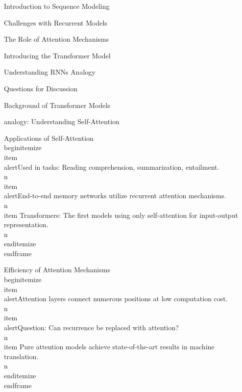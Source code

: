 \documentclass{beamer}
\begin{document}
\begin{frame}[]{Introduction to Sequence Modeling}
\begin{frame}[]{Challenges with Recurrent Models}
\begin{frame}[]{The Role of Attention Mechanisms}
\begin{frame}[]{Introducing the Transformer Model}
\begin{frame}[plain]{Understanding RNNs Analogy}
\begin{frame}[]{Questions for Discussion}
\begin{frame}[]{Background of Transformer Models}
\begin{frame}[plain]{analogy: Understanding Self-Attention}
\begingroup
{}\n{}\n\begin{frame}[]{Applications of Self-Attention}\n\\begin{itemize}
\\item \\alert{Used in tasks: Reading comprehension, summarization, entailment.}\\n\\item \\alert{End-to-end memory networks utilize recurrent attention mechanisms.}\\n\\item Transformers: The first models using only self-attention for input-output representation.\\n\\end{itemize}
\\end{frame}

\endgroup

\begingroup
{}\n{}\n\begin{frame}[]{Efficiency of Attention Mechanisms}\n\\begin{itemize}
\\item \\alert{Attention layers connect numerous positions at low computation cost.}\\n\\item \\alert{Question: Can recurrence be replaced with attention?}\\n\\item Pure attention models achieve state-of-the-art results in machine translation.\\n\\end{itemize}
\\end{frame}

\endgroup


\end{frame}
\end{frame}
\end{frame}
\end{frame}
\end{frame}
\end{frame}
\end{frame}
\end{frame}
\end{frame}
\end{frame}
\end{document}
